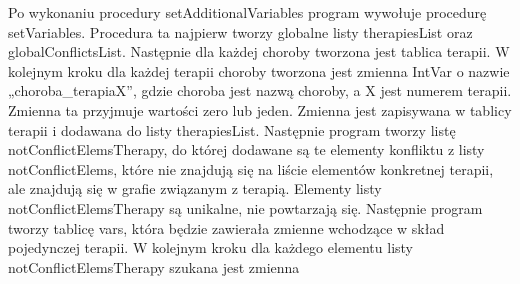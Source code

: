 Po wykonaniu procedury setAdditionalVariables program wywołuje procedurę setVariables. 
Procedura ta najpierw tworzy globalne listy therapiesList oraz globalConflictsList. Następnie dla każdej choroby tworzona jest tablica terapii. W kolejnym kroku dla każdej terapii choroby tworzona jest zmienna IntVar 
o nazwie „choroba\_terapiaX”, gdzie choroba jest nazwą choroby, a X jest numerem terapii. Zmienna ta przyjmuje wartości zero lub jeden. Zmienna jest zapisywana w tablicy terapii i dodawana do listy therapiesList. 
Następnie program tworzy listę notConflictElemsTherapy, do której dodawane są te elementy konfliktu z listy notConflictElems, które nie znajdują się na liście elementów konkretnej terapii, ale znajdują się w grafie związanym z terapią. Elementy listy notConflictElemsTherapy są unikalne, nie powtarzają się. Następnie program tworzy tablicę vars, która będzie zawierała zmienne wchodzące w skład pojedynczej terapii. W kolejnym kroku dla każdego elementu listy notConflictElemsTherapy szukana jest zmienna 
